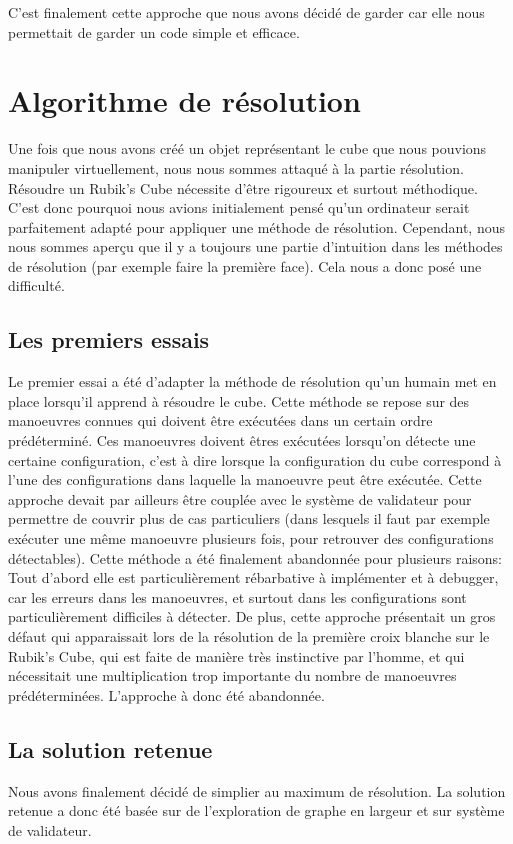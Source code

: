 C'est finalement cette approche que nous avons décidé de garder car elle nous permettait de garder un code simple et efficace.

\section{Algorithme de résolution}
Une fois que nous avons créé un objet représentant le cube que nous pouvions manipuler virtuellement, nous nous sommes attaqué à la partie résolution.
Résoudre un Rubik's Cube nécessite d'être rigoureux et surtout méthodique.
C'est donc pourquoi nous avions initialement pensé qu'un ordinateur serait parfaitement adapté pour appliquer une méthode de résolution.
Cependant, nous nous sommes aperçu que il y a toujours une partie d'intuition dans les méthodes de résolution (par exemple faire la première face).
Cela nous a donc posé une difficulté.

\subsection{Les premiers essais}
Le premier essai a été d'adapter la méthode de résolution qu'un humain met en place lorsqu'il apprend à résoudre le cube. Cette méthode se repose sur des manoeuvres connues qui doivent être exécutées dans un certain ordre prédéterminé.
Ces manoeuvres doivent êtres exécutées lorsqu'on détecte une certaine configuration, c'est à dire lorsque la configuration du cube correspond à l'une des configurations dans laquelle la manoeuvre peut être exécutée. Cette approche devait par ailleurs être couplée avec le système de validateur pour permettre de couvrir plus de cas particuliers (dans lesquels il faut par exemple exécuter une même manoeuvre plusieurs fois, pour retrouver des configurations détectables).
Cette méthode a été finalement abandonnée pour plusieurs raisons: Tout d'abord elle est particulièrement rébarbative à implémenter et à debugger, car les erreurs dans les manoeuvres, et surtout dans les configurations sont particulièrement difficiles à détecter.
De plus, cette approche présentait un gros défaut qui apparaissait lors de la résolution de la première croix blanche sur le Rubik's Cube, qui est faite de manière très instinctive par l'homme, et qui nécessitait une multiplication trop importante du nombre de manoeuvres prédéterminées.
L'approche à donc été abandonnée.
\subsection{La solution retenue}
Nous avons finalement décidé de simplier au maximum de résolution.
La solution retenue a donc été basée sur de l'exploration de graphe en largeur et sur système de validateur.

